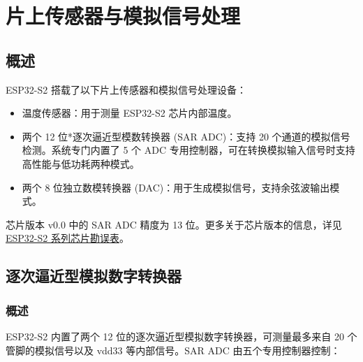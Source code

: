 \documentclass[main\_\_CN.tex]{subfiles}
\begin{document}
\raggedbottom

\ifglobal
\else
    {\let\clearpage\relax \listoftodos}
    {\let\clearpage\relax \listofdonetodos}
    \tableofcontents
\fi



\hypertarget{sensor}{}
\chapter{片上传感器与模拟信号处理}
\label{mod:sensor}


\section{概述}

ESP32-S2 搭载了以下片上传感器和模拟信号处理设备：

\begin{itemize}
    \item 温度传感器：用于测量 ESP32-S2 芯片内部温度。
    \item 两个 12 位*逐次逼近型模数转换器 (SAR ADC)：支持 20 个通道的模拟信号检测。系统专门内置了 5 个 ADC 专用控制器，可在转换模拟输入信号时支持高性能与低功耗两种模式。
    \item 两个 8 位独立数模转换器 (DAC)：用于生成模拟信号，支持余弦波输出模式。
\end{itemize}
\begin{tiplisting}
芯片版本 v0.0 中的 SAR ADC 精度为 13 位。更多关于芯片版本的信息，详见 \href{https://espressif.com/sites/default/files/documentation/esp32-s2\_errata\_cn.pdf}{ESP32-S2 系列芯片勘误表}。
\end{tiplisting}


\section{逐次逼近型模拟数字转换器}\label{ssec:saradc}

\subsection{概述}

ESP32-S2 内置了两个 12 位的逐次逼近型模拟数字转换器，可测量最多来自 20 个管脚的模拟信号以及 vdd33 等内部信号。SAR ADC 由五个专用控制器控制：
\end{document}
